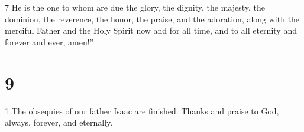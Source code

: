 \par 7 He is the one to whom are due the glory, the dignity, the majesty, the dominion, the reverence, the honor, the praise, and the adoration, along with the merciful Father and the Holy Spirit now and for all time, and to all eternity and forever and ever, amen!”

\chapter{9}

\par 1 The obsequies of our father Isaac are finished. Thanks and praise to God, always, forever, and eternally. 



